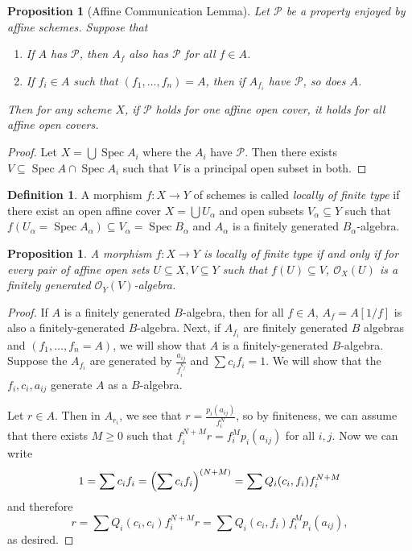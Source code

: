 \documentclass[leqno, openany]{memoir}
\newtheorem{prop}[thm]{Proposition}
\theoremstyle{definition}
\newtheorem{defn}[thm]{Definition}
\theoremstyle{remark}
\theoremstyle{plain}
\theoremstyle{definition}
\theoremstyle{remark}
\newcommand{\mc}[1]{\mathcal{#1}}
\DeclareMathOperator{\Spec}{Spec}
\begin{document}
\begin{prop}[Affine Communication Lemma]
    Let $\mc{P}$ be a property enjoyed by affine schemes. Suppose that
    \begin{enumerate}
        \item If $A$ has $\mc{P}$, then $A_f$ also has $\mc{P}$ for all $f \in A$.
        \item If $f_i \in A$ such that $(f_1, \ldots, f_n) = A$, then if $A_{f_i}$ have $\mc{P}$, so does $A$.
    \end{enumerate}
    Then for any scheme $X$, if $\mc{P}$ holds for one affine open cover, it holds for all affine open covers.
\end{prop}

\begin{proof}
    Let $X = \bigcup \Spec A_i$ where the $A_i$ have $\mc{P}$. Then there exists $V \subseteq \Spec A \cap \Spec A_i$ such that $V$ is a principal open subset in both.
\end{proof}

\begin{defn}
    A morphism $f \colon X \to Y$ of schemes is called \textit{locally of finite type} if there exist an open affine cover $X = \bigcup U_{\alpha}$ and open subsets $V_{\alpha} \subseteq Y$ such that $f(U_{\alpha} = \Spec A_{\alpha}) \subseteq V_{\alpha} = \Spec B_{\alpha}$ and $A_{\alpha}$ is a finitely generated $B_{\alpha}$-algebra.
\end{defn}

\begin{prop}
    A morphism $f \colon X \to Y$ is locally of finite type if and only if for every pair of affine open sets $U \subseteq X, V \subseteq Y$ such that $f(U) \subseteq V$, $\mc{O}_X(U)$ is a finitely generated $\mc{O}_Y(V)$-algebra.
\end{prop}

\begin{proof}
    If $A$ is a finitely generated $B$-algebra, then for all $f \in A$, $A_f = A[1/f]$ is also a finitely-generated $B$-algebra. Next, if $A_{f_i}$ are finitely generated $B$ algebras and $(f_1, \ldots, f_n = A)$, we will show that $A$ is a finitely-generated $B$-algebra. Suppose the $A_{f_i}$ are generated by $\frac{a_{ij}}{f_i^{k_j}}$ and $\sum c_i f_i = 1$. We will show that the $f_i, c_i, a_{ij}$ generate $A$ as a $B$-algebra.

    Let $r \in A$. Then in $A_{r_i}$, we see that $r = \frac{p_i(a_{ij})}{f_i^N}$, so by finiteness, we can assume that there exists $M \geq 0$ such that $f_i^{N+M} r = f_i^M p_i (a_{ij})$ for all $i,j$. Now we can write 
    \[ 1 = \sum c_i f_i = { \qty(\sum c_i f_i) }^{(N+M)} = \sum Q_i(c_i, f_i) f_i^{N+M} \]
    and therefore 
    \[ r = \sum Q_i(c_i, c_i) f_i^{N+M} r = \sum Q_i(c_i, f_i) f_i^M p_i(a_{ij}), \]
    as desired.
\end{proof}
\end{document}
